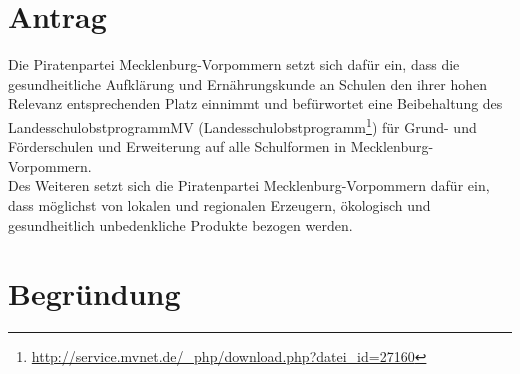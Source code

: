 \section{Antrag}

Die Piratenpartei Mecklenburg-Vorpommern setzt sich dafür ein, dass die gesundheitliche Aufklärung und Ernährungskunde an Schulen den ihrer hohen Relevanz entsprechenden Platz einnimmt und befürwortet eine Beibehaltung des LandesschulobstprogrammMV (Landesschulobstprogramm\footnote{\url{http://service.mvnet.de/\_php/download.php?datei\_id=27160}}) für Grund- und Förderschulen und Erweiterung auf alle Schulformen in Mecklenburg-Vorpommern.\\Des Weiteren setzt sich die Piratenpartei Mecklenburg-Vorpommern dafür ein, dass möglichst von lokalen und regionalen Erzeugern, ökologisch und gesundheitlich unbedenkliche Produkte bezogen werden.

\section{Begründung}

